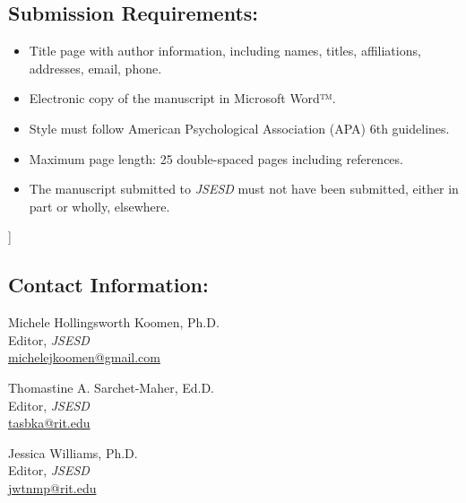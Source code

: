 \documentclass[11pt]{sig-alternate}
\begin{document}
\begin{large}
\begin{@twocolumnfalse}
\subsection*{Submission Requirements:}

\begin{itemize}
    \item Title page with author information, including names, titles, affiliations, addresses, email, phone.
    \item Electronic copy of the manuscript in Microsoft Word™.
    \item Style must follow American Psychological Association (APA) 6th guidelines.
    \item Maximum page length: 25 double-spaced pages including references.
    \item The manuscript submitted to \textit{JSESD} must not have been submitted, either in part or wholly, elsewhere.
\end{itemize}
\end{@twocolumnfalse}]

\subsection*{Contact Information:}

Michele Hollingsworth Koomen, Ph.D.\\
Editor, \textit{JSESD}\\
\href{mailto:michelejkoomen@gmail.com}{michelejkoomen@gmail.com}

Thomastine A. Sarchet-Maher, Ed.D.\\
Editor, \textit{JSESD}\\
\href{mailto:tasbka@rit.edu}{tasbka@rit.edu}

Jessica Williams, Ph.D.\\
Editor, \textit{JSESD}\\
\href{mailto:jwtnmp@rit.edu}{jwtnmp@rit.edu}

\end{large}
\end{document}
